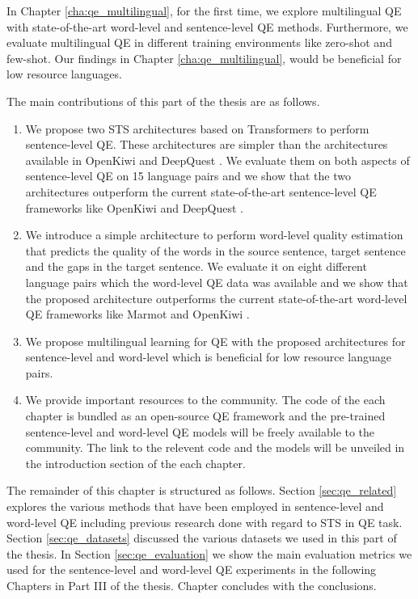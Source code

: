 In Chapter \ref{cha:qe_multilingual}, for the first time, we explore multilingual QE with state-of-the-art word-level and sentence-level QE methods. Furthermore, we evaluate multilingual QE in different training environments like zero-shot and few-shot. Our findings in Chapter \ref{cha:qe_multilingual}, would be beneficial for low resource languages. 


The main contributions of this part of the thesis are as follows.

\begin{enumerate}

	\item We propose two STS architectures based on Transformers to perform sentence-level QE. These architectures are simpler than the  architectures available in OpenKiwi \cite{kepler-etal-2019-openkiwi} and DeepQuest \cite{ive-etal-2018-deepquest}. We evaluate them on both aspects of sentence-level QE on 15 language pairs and we show that the two architectures outperform the current state-of-the-art sentence-level QE frameworks like OpenKiwi \cite{kepler-etal-2019-openkiwi} and DeepQuest \cite{ive-etal-2018-deepquest}.
	
	
	\item We introduce a simple architecture to perform word-level quality estimation that predicts the quality of the words in the source sentence, target sentence and the gaps in the target sentence. We evaluate it on eight different language pairs which the word-level QE data was available and we show that the proposed architecture outperforms the current state-of-the-art word-level QE frameworks like Marmot \cite{logacheva-etal-2016-marmot} and OpenKiwi \cite{kepler-etal-2019-openkiwi}.

	\item We propose multilingual learning for QE with the proposed architectures for sentence-level and word-level which is beneficial for low resource language pairs. 
	
	\item We provide important resources to the community. The code of the each chapter is bundled as an open-source QE framework and the pre-trained sentence-level and word-level QE models will be freely available to the community. The link to the relevent code and the models will be unveiled in the introduction section of the each chapter. 
\end{enumerate}

The remainder of this chapter is structured as follows. Section \ref{sec:qe_related} explores the various methods that have been employed in sentence-level and word-level QE including previous research done with regard to STS in QE task. Section \ref{sec:qe_datasets} discussed the various datasets we used in this part of the thesis. In Section \ref{sec:qe_evaluation} we show the main evaluation metrics we used for the sentence-level and word-level QE experiments in the following Chapters in Part III of the thesis.  Chapter concludes with the conclusions.



